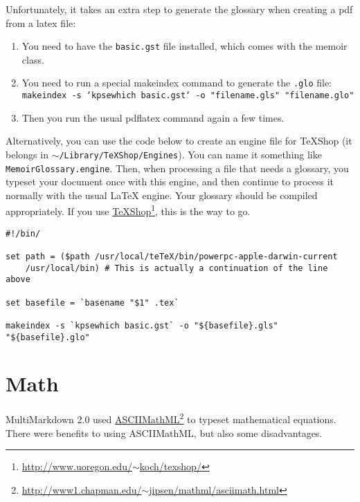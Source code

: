Unfortunately, it takes an extra step to generate the glossary when creating a
pdf from a latex file:

\begin{enumerate}
\item You need to have the \texttt{basic.gst} file installed, which comes with the
memoir class.

\item You need to run a special makeindex command to generate the \texttt{.glo} file:
\texttt{makeindex -s `kpsewhich basic.gst` -o "filename.gls" "filename.glo"}

\item Then you run the usual pdflatex command again a few times.

\end{enumerate}

Alternatively, you can use the code below to create an engine file for TeXShop (it belongs in \texttt{\ensuremath{\sim}\slash Library\slash TeXShop\slash Engines}). You can name it something like \texttt{MemoirGlossary.engine}. Then, when processing a file that needs a glossary, you typeset your document once with this engine, and then continue to process it normally with the usual LaTeX engine. Your glossary should be compiled appropriately. If you use \href{http://www.uoregon.edu/~koch/texshop/}{TeXShop}\footnote{\href{http://www.uoregon.edu/~koch/texshop/}{http:\slash \slash www.uoregon.edu\slash \ensuremath{\sim}koch\slash texshop\slash }}, this is the way to go.

\begin{verbatim}
#!/bin/	

set path = ($path /usr/local/teTeX/bin/powerpc-apple-darwin-current 
	/usr/local/bin) # This is actually a continuation of the line above

set basefile = `basename "$1" .tex`

makeindex -s `kpsewhich basic.gst` -o "${basefile}.gls" "${basefile}.glo"
\end{verbatim}

\section{Math }
\label{math}

MultiMarkdown 2.0 used \href{http://www1.chapman.edu/~jipsen/mathml/asciimath.html}{ASCIIMathML}\footnote{\href{http://www1.chapman.edu/~jipsen/mathml/asciimath.html}{http:\slash \slash www1.chapman.edu\slash \ensuremath{\sim}jipsen\slash mathml\slash asciimath.html}} to typeset mathematical equations. There
were benefits to using ASCIIMathML, but also some disadvantages.

